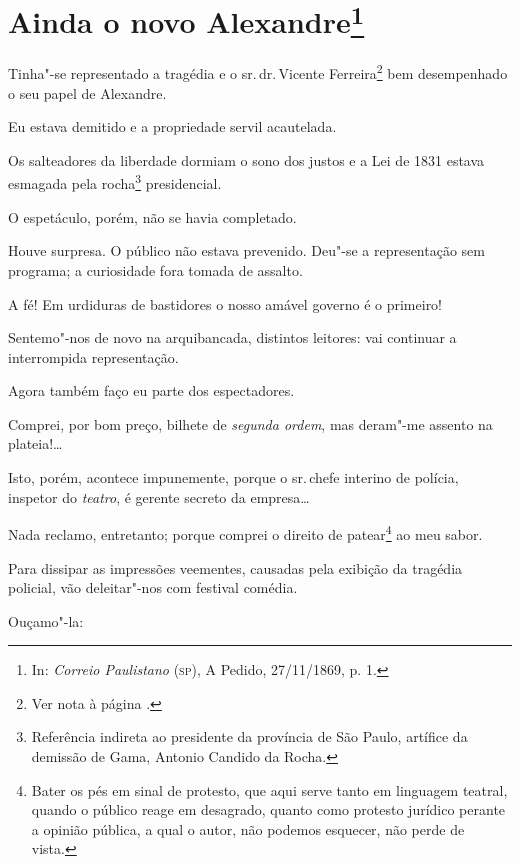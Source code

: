 \chapter{Ainda o novo Alexandre\footnote[*]{In: \emph{Correio
  Paulistano} (\textsc{sp}), A Pedido, 27/11/1869, p. 1.}}


Tinha"-se representado a tragédia e o sr.\,dr.\,Vicente Ferreira\footnote{Ver nota à página \pageref{bueno}.} bem desempenhado o seu
papel de Alexandre.

Eu estava demitido e a propriedade servil acautelada.

Os salteadores da liberdade dormiam o sono dos justos e a Lei de 1831
estava esmagada pela rocha\footnote{Referência indireta ao presidente
  da província de São Paulo, artífice da demissão de Gama, Antonio
  Candido da Rocha.} presidencial.

O espetáculo, porém, não se havia completado.

Houve surpresa. O público não estava prevenido. Deu"-se a representação
sem programa; a curiosidade fora tomada de assalto.

A fé! Em urdiduras de bastidores o nosso amável governo é o primeiro!

Sentemo"-nos de novo na arquibancada, distintos leitores: vai continuar a
interrompida representação.

Agora também faço eu parte dos espectadores.

Comprei, por bom preço, bilhete de \emph{segunda ordem}, mas deram"-me
assento na plateia!\ldots{}

Isto, porém, acontece impunemente, porque o sr.\,chefe interino de
polícia, inspetor do \emph{teatro}, é gerente secreto da empresa\ldots{}

Nada reclamo, entretanto; porque comprei o direito de patear\footnote{
  Bater os pés em sinal de protesto, que aqui serve tanto em linguagem
  teatral, quando o público reage em desagrado, quanto como protesto
  jurídico perante a opinião pública, a qual o autor, não podemos
  esquecer, não perde de vista.} ao meu sabor.

Para dissipar as impressões veementes, causadas pela exibição da
tragédia policial, vão deleitar"-nos com festival comédia.

Ouçamo"-la:

